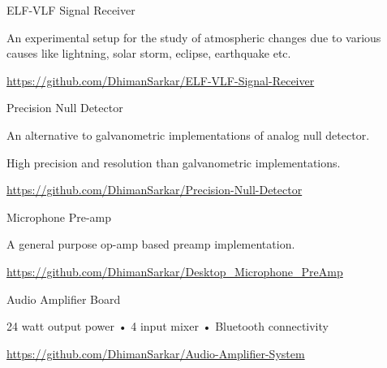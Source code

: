 \begin{cventries}

  \cventry
    {ELF-VLF Signal Receiver} %
    {} %
    {} %
    {} %
    {
      \begin{cvitems} %
        \item {An experimental setup for the study of atmospheric changes due to various causes like lightning, solar storm, eclipse, earthquake etc.}
        \item {\href{https://github.com/DhimanSarkar/ELF-VLF-Signal-Receiver}{https://github.com/DhimanSarkar/ELF-VLF-Signal-Receiver}}
      \end{cvitems}
    }

  \cventry
    {Precision Null Detector} %
    {} %
    {} %
    {} %
    {
      \begin{cvitems} %
        \item {An alternative to galvanometric implementations of analog null detector.}
        \item{High precision and resolution than galvanometric implementations.}
        \item {\href{https://github.com/DhimanSarkar/Precision-Null-Detector}{https://github.com/DhimanSarkar/Precision-Null-Detector}}
      \end{cvitems}
    }


  \cventry
    {Microphone Pre-amp} %
    {} %
    {} %
    {} %
    {
      \begin{cvitems} %
        \item {A general purpose op-amp based preamp implementation.}
        \item {\href{https://github.com/DhimanSarkar/Desktop_Microphone_PreAmp}{https://github.com/DhimanSarkar/Desktop_Microphone_PreAmp}}
      \end{cvitems}
    }



  \cventry
    {Audio Amplifier Board} %
    {} %
    {} %
    {} %
    {
      \begin{cvitems} %
        \item {24 watt output power • 4 input mixer • Bluetooth connectivity}
        \item {\href{https://github.com/DhimanSarkar/Audio-Amplifier-System}{https://github.com/DhimanSarkar/Audio-Amplifier-System}}
      \end{cvitems}
    }
\end{cventries}

